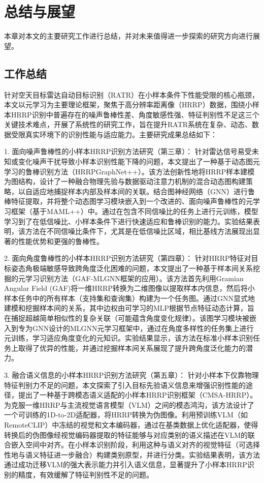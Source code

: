 \chapter{总结与展望}
\label{chap:conclusion}

本章对本文的主要研究工作进行总结，并对未来值得进一步探索的研究方向进行展望。

\section{工作总结}
\label{sec:summary}

针对空天目标雷达自动目标识别（RATR）在小样本条件下性能受限的核心瓶颈，本文以元学习为主要理论框架，聚焦于高分辨率距离像（HRRP）数据，围绕小样本HRRP识别中普遍存在的噪声鲁棒性差、角度敏感性强、特征判别性不足这三个关键技术难点，开展了系统性的研究工作，旨在提升RATR系统在复杂、动态、数据受限真实环境下的识别性能与适应能力。主要研究成果总结如下：

1.  面向噪声鲁棒性的小样本HRRP识别方法研究（第三章）： 针对雷达信号易受未知或变化噪声干扰导致小样本识别性能下降的问题，本文提出了一种基于动态图元学习的鲁棒识别方法（HRRPGraphNet++）。该方法创新性地将HRRP样本建模为图结构，设计了一种融合物理先验与数据驱动注意力机制的混合动态图构建策略，以自适应地捕捉样本内部及样本间的关联。结合图神经网络（GNN）进行鲁棒特征提取，并将整个动态图学习模块嵌入到一个改进的、面向噪声鲁棒性的元学习框架（基于MAML++）中。通过在包含不同信噪比的任务上进行元训练，模型学习到了在低信噪比、小样本条件下进行快速适应和鲁棒识别的能力。实验结果表明，该方法在不同信噪比条件下，尤其是在低信噪比区域，相比基线方法展现出显著的性能优势和更强的鲁棒性。

2.  面向角度鲁棒性的小样本HRRP识别方法研究（第四章）： 针对HRRP特征对目标姿态角极端敏感导致跨角度泛化困难的问题，本文提出了一种基于样本间关系挖掘的元学习识别方法（GAF-MLGNN框架的应用）。该方法首先利用Gramian Angular Field (GAF)将一维HRRP转换为二维图像以提取样本内信息，然后将小样本任务中的所有样本（支持集和查询集）构建为一个任务图。通过GNN显式地建模和挖掘样本间的关系，其中边权由可学习的MLP根据节点特征动态计算，旨在捕捉超越简单相似性的复杂关联（可能蕴含角度变化规律）。该图学习模块被嵌入到专为GNN设计的MLGNN元学习框架中，通过在角度多样性的任务集上进行元训练，学习适应角度变化的元知识。实验结果显示，该方法在标准小样本识别任务上取得了优异的性能，并通过挖掘样本间关系展现了提升跨角度泛化能力的潜力。

3.  融合语义信息的小样本HRRP识别方法研究（第五章）： 针对小样本下仅靠物理特征判别力不足的问题，本文探索了引入目标先验语义信息来增强识别性能的途径，提出了一种基于跨模态语义适配的小样本HRRP识别框架（CMSA-HRRP）。为克服一维HRRP与主流视觉语言模型（VLM）之间的模态鸿沟，该方法设计了一个可训练的1D-to-2D适配器，将HRRP转换为伪图像。利用预训练VLM（如RemoteCLIP）中冻结的视觉和文本编码器，通过在基类数据上优化适配器，使得转换后的伪图像经视觉编码器提取的特征能够与对应类别的语义描述在VLM的联合嵌入空间中对齐。在小样本识别阶段，利用这种与语义对齐的视觉特征（可选择性地与语义特征进一步融合）构建类别原型，并进行分类。实验结果表明，该方法通过成功迁移VLM的强大表示能力并引入语义信息，显著提升了小样本HRRP识别的精度，有效缓解了特征判别性不足的问题。

